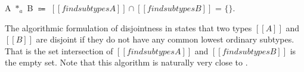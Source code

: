 \begin{definition}
\label{def:inter:ad}
  A $*_a$ B $\Coloneqq$  $ [[findsubtypes A]] \cap [[findsubtypes B]] $ = $\{\}$.
\end{definition}

\noindent The algorithmic formulation of disjointness in
 states that two
types $[[A]]$ and $[[B]]$ are disjoint
if they do not have any common lowest ordinary subtypes. That is the
set intersection of $[[findsubtypes A]]$ and $[[findsubtypes B]]$ is the empty set.
Note that this algorithm is naturally very close to .
\begin{comment}
We illustrate \Cref{def:inter:ad} with a few examples:

\begin{enumerate}
  \item $\boldsymbol{A = [[Int]], \ B = \ [[A -> B]]:}$ \\
        $[[findsubtypes Int]]$ returns \{$[[Int]]$\} and $[[findsubtypes A -> B]]$ returns
        \{$[[Top -> Bot]]$\}. Set intersection of \{$[[Int]]$\} and \{$[[Top -> Bot]]$\} is
        empty set \{\}. Therefore, $[[Int]]$ and $[[A -> B]]$ are disjoint types.
  \item $\boldsymbol{A = [[Int]], \ B = \ [[Bot]]:}$ \\
        $[[findsubtypes Int]]$ returns \{$[[Int]]$\} and $[[findsubtypes Bot]]$ returns
        \{\}. Set intersection of \{$[[Int]]$\} and \{\} is
        empty set \{\}. Therefore, $[[Int]]$ and $[[Bot]]$ are disjoint types.
        In general, type $[[Bot]]$ is disjoint to all types because $[[findsubtypes Bot]]$
        will always return \{\} and intersection of \{\} with all other sets is \{\}.
  \item $\boldsymbol{A = [[Int /\ A -> B]], \ B = \ [[Int]]:}$ \\
        $[[findsubtypes Int /\ A -> B]]$ returns \{\} and $[[findsubtypes Int]]$ returns
        \{$[[Int]]$\}. Set intersection of \{\} and \{$[[Int]]$\} is
        empty set \{\}. Therefore, $[[Int /\ A -> B]]$ and $[[Int]]$ are disjoint types.
        In general, intersection type of two disjoint types which is $[[Int /\ A -> B]]$ in this case,
        is always disjoint to all types.
  \item $\boldsymbol{A = [[Int]], \ B = \ [[Top]]:}$ \\
        $[[findsubtypes Int]]$ returns \{$[[Int]]$\} and $[[findsubtypes Top]]$ returns
        \{$[[Int]]$, $[[Top -> Bot]]$\}.
        Set intersection of \{$[[Int]]$\} and \{$[[Int]]$, $[[Top -> Bot]]$\} is
        set \{$[[Int]]$\}. Therefore, $[[Int]]$ and $[[Top]]$ are not disjoint types.
\end{enumerate}
\end{comment}

